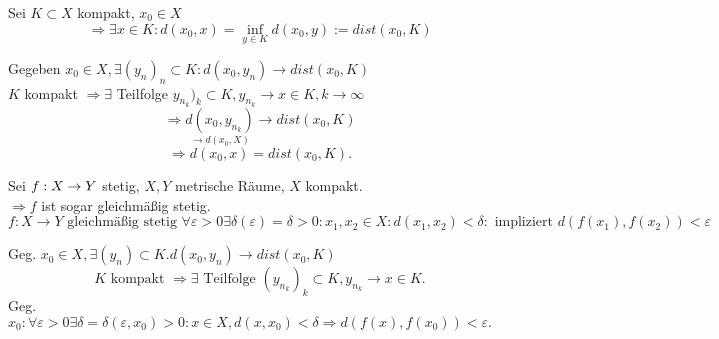 \documentclass[../ana2.tex]{subfiles}
\begin{document}
\begin{bem}
    Sei \(K \subset X\) kompakt, \(x_0 \in X\)
    \[ \Rightarrow \exists x \in K: d(x_0, x) 
    = \underset{y \in K}{\inf} d(x_0, y) 
    := dist(x_0, K) \]
\end{bem}
\begin{bew}
    Gegeben \( x_0 \in X, \exists (y_n)_n \subset K: 
    d(x_0, y_n) \rightarrow dist(x_0, K) \) \\
    \(K\) kompakt \( \Rightarrow \exists \) Teilfolge 
    \(y_{n_k})_k \subset K, y_{n_k} \rightarrow x \in K, 
    k \rightarrow \infty\)    
    \[ \Rightarrow \underset{\rightarrow d(x_0, X)}{d(x_0, y_{n_k})} 
    \rightarrow dist(x_0, K) \]
    \[ \Rightarrow d(x_0, x) = dist(x_0, K). \]
\end{bew}
\begin{satz}
    Sei \( f:X\rightarrow Y \) stetig, 
    \( X, Y \) metrische Räume, \(X\)
    kompakt. \\
    \( \Rightarrow f \) ist sogar gleichmäßig 
    stetig.
    \[ f: X \rightarrow Y \text{ gleichmäßig stetig }
    \forall \varepsilon > 0 \exists 
    \delta(\varepsilon) = \delta > 0:
    x_1, x_2 \in X: d(x_1, x_2) < \delta:
    \text{ impliziert } d(f(x_1), f(x_2)) < \varepsilon \]
\end{satz}
\begin{bew}
    Geg. \( x_0 \in X, \exists (y_n) \subset K. d(x_0, y_n) 
    \rightarrow dist(x_0, K) \)
    \[ K \text{ kompakt } \Rightarrow \exists \text{ Teilfolge } 
    (y_{n_k})_k \subset K, y_{n_k} \rightarrow x \in K. \]
    Geg. \( x_0: \forall \varepsilon > 0 \exists \delta 
    = \delta(\varepsilon, x_0) > 0:
    x \in X, d(x, x_0) < \delta \Rightarrow d(f(x), f(x_0)) 
    < \varepsilon. \)
\end{bew}
\end{document}
